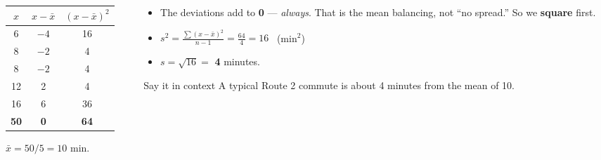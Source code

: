 \documentclass[aspectratio=169, 11pt]{beamer}
\newcommand{\redink}[1]{{\color{redacc}\bfseries #1}}
\begin{document}
\begin{frame}[t, plain]
  \begin{columns}[t]
    \begin{column}{0.46\textwidth}
      \begin{center}
        \small\renewcommand{\arraystretch}{1.2}
        \begin{tabular}{c c c}
          \hline
          $x$ & $x - \bar{x}$ & $(x - \bar{x})^2$ \\
          \hline
          6 & $-4$ & 16 \\
          8 & $-2$ & 4 \\
          8 & $-2$ & 4 \\
          12 & 2 & 4 \\
          16 & 6 & 36 \\
          \hline
          \textbf{50} & \redink{0} & \textbf{64} \\
          \hline
        \end{tabular}
      \end{center}
      {\small $\bar{x} = 50/5 = 10$ min.}
    \end{column}
    \begin{column}{0.5\textwidth}
      \begin{itemize}\setlength{\itemsep}{3pt}
        \item The deviations add to \redink{0} --- \emph{always}. That is the mean balancing, not
              ``no spread.'' So we \textbf{square} first.
        \item $\displaystyle s^2 = \frac{\sum (x - \bar{x})^2}{n - 1} = \frac{64}{4} = 16$
              \ (min$^2$)
        \item $s = \sqrt{16} =$ \redink{4} minutes.
      \end{itemize}
      \begin{block}{Say it in context}
        A typical Route 2 commute is about 4 minutes from the mean of 10.
      \end{block}
    \end{column}
  \end{columns}
\end{frame}
\end{document}
